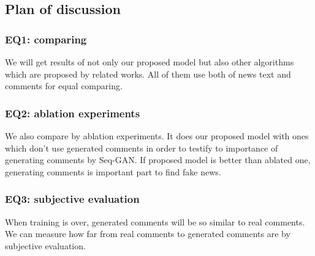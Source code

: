 \subsection{Plan of discussion}
\subsubsection{EQ1: comparing}
We will get results of not only our proposed model but also other algorithms which are proposed by related works.
All of them use both of news text and comments for equal comparing.
\subsubsection{EQ2: ablation experiments}
We also compare by ablation experiments.
It does our proposed model with ones which don't use generated comments in order to
testify to importance of generating comments by Seq-GAN.
If proposed model is better than ablated one, generating comments is important part to find fake news.
\subsubsection{EQ3: subjective evaluation}
When training is over, generated comments will be so similar to real comments.
We can measure how far from real comments to generated comments are by subjective evaluation.